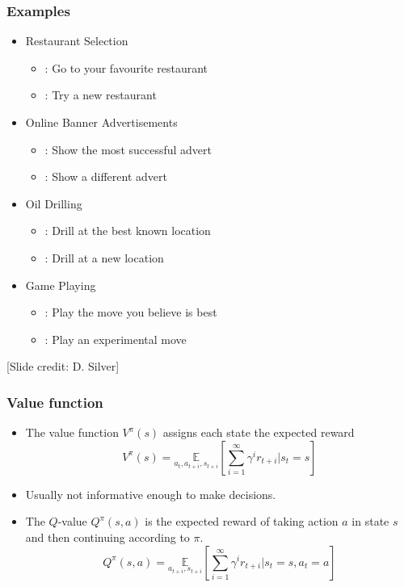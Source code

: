 \documentclass[handout]{beamer}
\begin{document}
\begin{frame}\frametitle{Examples}\small
\begin{itemize}
\item Restaurant Selection
\begin{itemize}
\item {}: Go to your favourite restaurant
\item {}: Try a new restaurant
\end{itemize}
\item Online Banner Advertisements
\begin{itemize}
\item {}: Show the most successful advert
\item {}: Show a different advert
\end{itemize}
\item Oil Drilling
\begin{itemize}
\item {}: Drill at the best known location
\item {}: Drill at a new location
\end{itemize}
\item Game Playing
\begin{itemize}
\item {}: Play the move you believe is best
\item {}: Play an experimental move
\end{itemize}
\end{itemize}
\vspace{1mm}
\scriptsize [Slide credit: D. Silver]
\end{frame}

\begin{frame}\frametitle{Value function}\small
\begin{itemize}
\item The value function $V^\pi(s)$ assigns each state the expected reward 
\[
V^\pi(s)=\underset{a_{t},a_{t+i},s_{t+i}}{\mathbb{E}}\left[\sum_{i=1}^\infty\gamma^{i} r_{t+i} |s_t=s\right]
\]
\item Usually not informative enough to make decisions.
\item The $Q$-value $Q^{\pi}(s,a)$ is the expected reward of taking action $a$ in state $s$ and then continuing according to $\pi$.
\[
Q^\pi(s,a)=\underset{a_{t+i},s_{t+i}}{\mathbb{E}}\left[\sum_{i=1}^\infty\gamma^{i} r_{t+i} |s_t=s,a_t=a\right]
\]
\end{itemize}
\end{frame}
\end{document}
